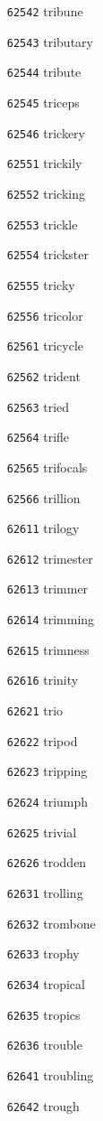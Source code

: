 \documentclass[twoside,11pt]{article}
\begin{document}
\begin{multicols}{5}
\begin{enumerate}
\item[\texttt{62542}] tribune
\item[\texttt{62543}] tributary
\item[\texttt{62544}] tribute
\item[\texttt{62545}] triceps
\item[\texttt{62546}] trickery
\item[\texttt{62551}] trickily
\item[\texttt{62552}] tricking
\item[\texttt{62553}] trickle
\item[\texttt{62554}] trickster
\item[\texttt{62555}] tricky
\item[\texttt{62556}] tricolor
\item[\texttt{62561}] tricycle
\item[\texttt{62562}] trident
\item[\texttt{62563}] tried
\item[\texttt{62564}] trifle
\item[\texttt{62565}] trifocals
\item[\texttt{62566}] trillion
\item[\texttt{62611}] trilogy
\item[\texttt{62612}] trimester
\item[\texttt{62613}] trimmer
\item[\texttt{62614}] trimming
\item[\texttt{62615}] trimness
\item[\texttt{62616}] trinity
\item[\texttt{62621}] trio
\item[\texttt{62622}] tripod
\item[\texttt{62623}] tripping
\item[\texttt{62624}] triumph
\item[\texttt{62625}] trivial
\item[\texttt{62626}] trodden
\item[\texttt{62631}] trolling
\item[\texttt{62632}] trombone
\item[\texttt{62633}] trophy
\item[\texttt{62634}] tropical
\item[\texttt{62635}] tropics
\item[\texttt{62636}] trouble
\item[\texttt{62641}] troubling
\item[\texttt{62642}] trough

\end{enumerate}
\end{multicols}
\end{document}
